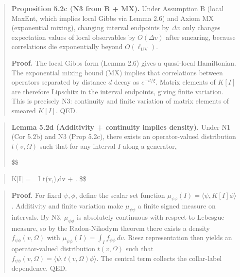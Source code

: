 \documentclass[11pt,a4paper]{article}
\theoremstyle{remark}
\begin{document}
\begin{quote}
\textbf{Proposition 5.2c (N3 from B + MX).} Under Assumption B (local MaxEnt,
which implies local Gibbs via Lemma 2.6) and Axiom MX (exponential mixing),
changing interval endpoints by \(\Delta v\) only changes expectation values of
local observables by \(O(\Delta v)\) after smearing, because correlations die
exponentially beyond \(O(\ell_{\mathrm{UV}})\).

\textbf{Proof.} The local Gibbs form (Lemma 2.6) gives a quasi-local Hamiltonian.
The exponential mixing bound (MX) implies that correlations between operators
separated by distance \(d\) decay as \(e^{-d/\xi}\). Matrix elements of \(K[I]\)
are therefore Lipschitz in the interval endpoints, giving finite variation.
This is precisely N3: continuity and finite variation of matrix elements of
smeared \(K[I]\). QED.
\end{quote}

\begin{quote}
\textbf{Lemma 5.2d (Additivity + continuity implies density).} Under N1 (Cor
5.2b) and N3 (Prop 5.2c), there exists an operator-valued distribution
\(t(v,\Omega)\) such that for any interval \(I\) along a generator,

\$\$
\end{quote}

\begin{quote}
K{[}I{]} = \int\_I t(v,\Omega),dv + .
\$\$
\end{quote}

\begin{quote}
\textbf{Proof.} For fixed \(\psi,\phi\), define the scalar set function
\(\mu_{\psi\phi}(I) = \langle \psi, K[I] \phi \rangle\). Additivity and finite
variation make \(\mu_{\psi\phi}\) a finite signed measure on intervals. By
N3, \(\mu_{\psi\phi}\) is absolutely continuous with respect to Lebesgue
measure, so by the Radon-Nikodym theorem there exists a density
\(f_{\psi\phi}(v,\Omega)\) with \(\mu_{\psi\phi}(I)=\int_I f_{\psi\phi}\,dv\).
Riesz representation then yields an operator-valued distribution
\(t(v,\Omega)\) such that \(f_{\psi\phi}(v,\Omega)=\langle \psi, t(v,\Omega)
\phi \rangle\). The central term collects the collar-label dependence. QED.
\end{quote}
\end{document}
